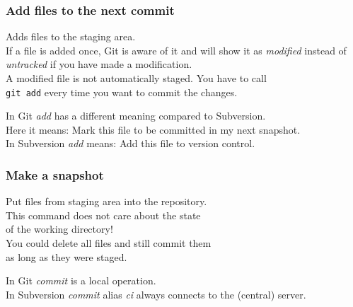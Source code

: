 \documentclass[handout,notes]{gittalk}
\newcommand{\hlcommand}[1]{ %
\colorbox{base3}{\small \texttt{#1}}
}
\begin{document}
\begin{frame}
\frametitle{Add files to the next commit}
\begin{tcolorbox}[title=git add]
Adds files to the staging area.\\[0.5em]
If a file is added once, Git is aware of it and will show it as \emph{modified}
instead of \emph{untracked} if you have made a modification.\\[0.5em]
A modified file is not automatically staged. You have to call\\
\hlcommand{git add} every time you want to commit the changes.
\end{tcolorbox}
\vspace*{0.5em}
In Git \emph{add} has a different meaning compared to Subversion.\\[0.5em]
Here it means: Mark this file to be committed in my next snapshot.\\[0.5em]
In Subversion \emph{add} means: Add this file to version control.
\end{frame}

\begin{frame}
\frametitle{Make a snapshot}
\begin{tcolorbox}[title=git commit]
Put files from staging area into the repository.\\[0.5em]
This command does not care about the state\\
of the working directory!\\[0.5em]
You could delete all files and still commit them\\
as long as they were staged.
\end{tcolorbox}
\vspace*{0.5em}
In Git \emph{commit} is a local operation.\\[0.5em]
In Subversion \emph{commit} alias \emph{ci} always connects to the (central) server.
\end{frame}
\end{document}
